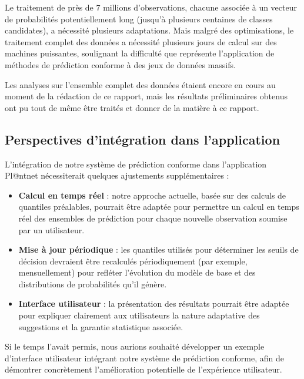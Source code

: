 \documentclass[a4paper,12pt]{article}
\begin{document}
\vspace{0.2cm}

Le traitement de près de $7$ millions d'observations, chacune associée à un vecteur de probabilités potentiellement long (jusqu'à plusieurs centaines de classes candidates), a nécessité plusieurs adaptations. Mais malgré des optimisations, le traitement complet des données a nécessité plusieurs jours de calcul sur des machines puissantes, soulignant la difficulté que représente l'application de méthodes de prédiction conforme à des jeux de données massifs.

\vspace{0.2cm}

Les analyses sur l'ensemble complet des données étaient encore en cours au moment de la rédaction de ce rapport, mais les résultats préliminaires obtenus ont pu tout de même être traités et donner de la matière à ce rapport.

\subsection{Perspectives d'intégration dans l'application}

L'intégration de notre système de prédiction conforme dans l'application Pl@ntnet nécessiterait quelques ajustements supplémentaires :
\begin{itemize}
    \item \textbf{Calcul en temps réel} : notre approche actuelle, basée sur des calculs de quantiles préalables, pourrait être adaptée pour permettre un calcul en temps réel des ensembles de prédiction pour chaque nouvelle observation soumise par un utilisateur.
    \item \textbf{Mise à jour périodique} : les quantiles utilisés pour déterminer les seuils de décision devraient être recalculés périodiquement (par exemple, mensuellement) pour refléter l'évolution du modèle de base et des distributions de probabilités qu'il génère.
    \item \textbf{Interface utilisateur} : la présentation des résultats pourrait être adaptée pour expliquer clairement aux utilisateurs la nature adaptative des suggestions et la garantie statistique associée.
\end{itemize}

\vspace{0.2cm}

Si le temps l'avait permis, nous aurions souhaité développer un exemple d'interface utilisateur intégrant notre système de prédiction conforme, afin de démontrer concrètement l'amélioration potentielle de l'expérience utilisateur.
\end{document}
